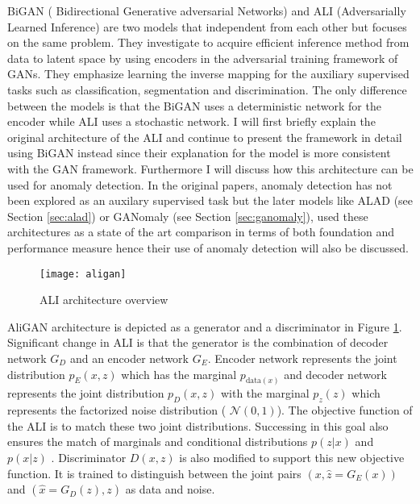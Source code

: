 { BiGAN ( Bidirectional Generative adversarial Networks) \cite{Donahue2017AdversarialFL} and ALI
 (Adversarially Learned Inference) \cite{Dumoulin2017AdversariallyLI} are two models that
 independent from each other but focuses on the same problem. They investigate to acquire efficient
 inference method from data to latent space by using encoders in the adversarial training framework
 of GANs. They emphasize learning the inverse mapping for the auxiliary supervised tasks such as
 classification, segmentation and discrimination. The only difference between the models is that the
 BiGAN uses a deterministic network for the encoder while ALI uses a stochastic network. I will
 first briefly explain the original architecture of the ALI and continue to present the framework in
 detail using BiGAN instead since their explanation for the model is more consistent with the GAN
 framework. Furthermore I will discuss how this architecture can be used for anomaly detection. In
 the original papers, anomaly detection has not been explored as an auxilary supervised task but the
 later models like ALAD (see Section \ref{sec:alad}) or GANomaly (see Section \ref{sec:ganomaly}), used these
 architectures as a state of the art comparison in terms of both foundation and performance measure
 hence their use of anomaly detection will also be discussed.

\begin{figure}[h!]
	\centering
	\texttt{[image: aligan]}
    \caption{ALI architecture overview}
    \label{fig:aligan_model}
\end{figure}

AliGAN architecture is depicted as a generator and a discriminator in Figure \ref{fig:aligan_model}.
Significant change in ALI is that the generator is the combination of decoder network $G_D$ and an
encoder network $G_E$. Encoder network represents the joint distribution $p_{E}(x, z)$ which has the marginal
$p_{\text{data}(x)}$ and decoder network represents the joint distribution $p_{D}(x, z)$ with the marginal
$p_z(z)$ which represents the factorized noise distribution ( $\mathcal{N}(0, 1)$). The
objective function of the ALI is to match these two joint distributions. Successing in this goal
also ensures the match of marginals and conditional distributions $p(z | x)$ and $p(x | z)$
. Discriminator $D(x,z)$ is also modified to support this new objective function. It is trained to
distinguish between the joint pairs  $(x, \hat{z} = G_{E}(x))$ and $(\hat{x} = G_{D}(z), z)$ as data
and noise.

}
